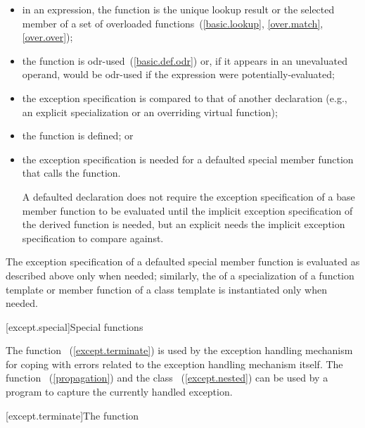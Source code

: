 \begin{itemize}
\item in an expression, the function is the unique lookup result or the selected
member of a set of overloaded functions~(\ref{basic.lookup}, \ref{over.match}, \ref{over.over});

\item the function is odr-used~(\ref{basic.def.odr}) or, if it appears in an
unevaluated operand, would be odr-used if the expression were
potentially-evaluated;

\item the exception specification is compared to that of another
declaration (e.g., an explicit specialization or an overriding virtual
function);

\item the function is defined; or

\item the exception specification is needed for a defaulted
special member function that calls the function.
\begin{note} A defaulted declaration does not require the
exception specification of a base member function to be evaluated
until the implicit exception specification of the derived
function is needed, but an explicit  needs
the implicit exception specification to compare against.
\end{note}
\end{itemize}
The exception specification of a defaulted special member
function is evaluated as described above only when needed; similarly, the
 of a specialization of a function
template or member function of a class template is instantiated only when
needed.

[except.special]{Special functions}

\pnum
The function ~(\ref{except.terminate})
is used by the exception
handling mechanism for coping with errors related to the exception handling
mechanism itself. The function
~(\ref{propagation}) and the class
~(\ref{except.nested}) can be used by a program to
capture the currently handled exception.

[except.terminate]{The  function}

